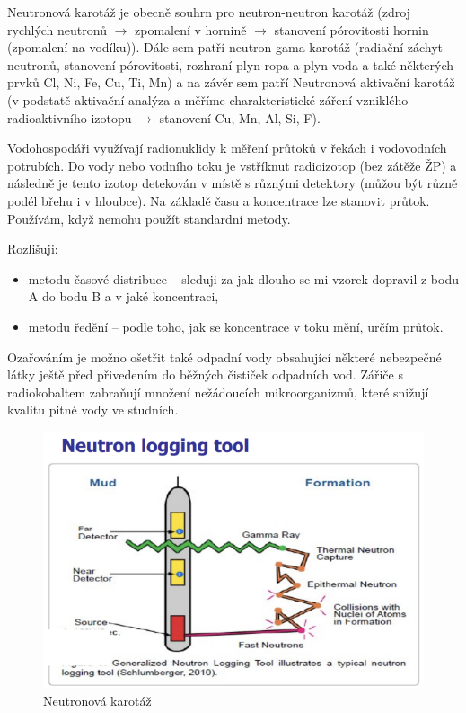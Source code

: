 \begin{itemize}
    Neutronová karotáž je obecně souhrn pro neutron-neutron karotáž (zdroj rychlých neutronů $\rightarrow$ zpomalení v hornině $\rightarrow$ stanovení pórovitosti hornin (zpomalení na vodíku)). Dále sem patří neutron-gama karotáž (radiační záchyt neutronů, stanovení pórovitosti, rozhraní plyn-ropa a plyn-voda a také některých prvků Cl, Ni, Fe, Cu, Ti, Mn) a na závěr sem patří Neutronová aktivační karotáž (v podstatě aktivační analýza a měříme charakteristické záření vzniklého radioaktivního izotopu $\rightarrow$ stanovení Cu, Mn, Al, Si, F).
    

\end{itemize}

Vodohospodáři využívají radionuklidy k měření průtoků v řekách i vodovodních potrubích. Do vody nebo vodního toku je vstříknut radioizotop (bez zátěže ŽP) a následně je tento izotop detekován v místě s různými detektory (můžou být různě podél břehu i v hloubce). Na základě času a koncentrace lze stanovit průtok. Používám, když nemohu použít standardní metody. 

Rozlišuji:

\begin{itemize}
    \item metodu časové distribuce -- sleduji za jak dlouho se mi vzorek dopravil z bodu A do bodu B a v jaké koncentraci,
    \item metodu ředění -- podle toho, jak se koncentrace v toku mění, určím průtok.
\end{itemize}

Ozařováním je možno ošetřit také odpadní vody obsahující některé nebezpečné látky ještě před přivedením do běžných čističek odpadních vod. Zářiče s radiokobaltem zabraňují množení nežádoucích mikroorganizmů, které snižují kvalitu pitné vody ve studních.

\begin{figure}[H]
    \centering
    \includegraphics[width=0.8\linewidth]{img/Neutronová karotáž.png}
    \caption{Neutronová karotáž}
\end{figure}

